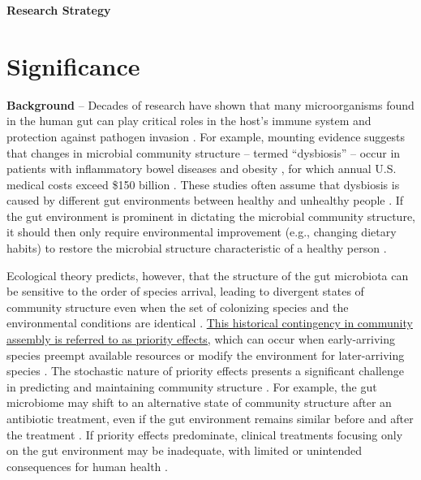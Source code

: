 \documentclass[12pt, class=article, crop=false]{standalone}
\begin{document}
\textbf{Research Strategy}

\section{Significance}

\textbf{Background} --
Decades of research have shown that many microorganisms found in the human gut can play critical roles in the host's immune system and protection against pathogen invasion \citep{fierer_animalcules_2012, petersen_defining_2014, turroni_infant_2020}.
For example, mounting evidence suggests that changes in microbial community structure -- termed ``dysbiosis'' -- occur in patients with inflammatory bowel diseases \citep{frank_molecular-phylogenetic_2007, karlsson_gut_2013, abrahamsson_low_2014, parracho_differences_2005} and obesity \citep{costello_application_2012, ley_obesity_2005, turnbaugh_diet-induced_2008}, for which annual U.S. medical costs exceed \$150 billion \citep{singh_trends_2022, cawley_medical_2012}.
These studies often assume that dysbiosis is caused by different gut environments between healthy and unhealthy people \citep{fierer_animalcules_2012, petersen_defining_2014}.
If the gut environment is prominent in dictating the microbial community structure, it should then only require environmental improvement (e.g., changing dietary habits) to restore the microbial structure characteristic of a healthy person \citep{chase_community_2003, leibold_metacommunity_2004, fukami_historical_2015, hooper_how_2002, reese_thinking_2019}.

Ecological theory predicts, however, that the structure of the gut microbiota can be sensitive to the order of species arrival, leading to divergent states of community structure even when the set of colonizing species and the environmental conditions are identical \citep{fierer_animalcules_2012, david_host_2014, akagawa_effect_2019, ojima_priority_2022, debray_priority_2022}.
\ul{This historical contingency in community assembly is referred to as priority effects,} which can occur when early-arriving species preempt available resources or modify the environment for later-arriving species \citep{fukami_historical_2015, ke_coexistence_2018}.
The stochastic nature of priority effects presents a significant challenge in predicting and maintaining community structure \citep{fukami_historical_2015}.
For example, the gut microbiome may shift to an alternative state of community structure after an antibiotic treatment, even if the gut environment remains similar before and after the treatment \citep{dethlefsen_incomplete_2011, jakobsson_short-term_2010}.
If priority effects predominate, clinical treatments focusing only on the gut environment may be inadequate, with limited or unintended consequences for human health \citep{fierer_animalcules_2012}.
\end{document}
